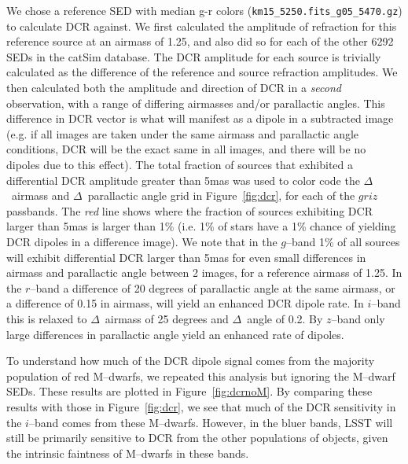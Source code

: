 \documentclass[DM,toc]{lsstdoc}
\begin{document}
We chose a reference SED with median g-r colors
(\texttt{km15\_5250.fits\_g05\_5470.gz}) to calculate DCR against.  We first
calculated the amplitude of refraction for this reference source at an
airmass of 1.25, and also did so for each of the other 6292 SEDs in
the catSim database.  The DCR amplitude for each source is trivially
calculated as the difference of the reference and source refraction
amplitudes.  We then calculated both the amplitude and direction of
DCR in a \emph{second} observation, with a range of differing airmasses
and/or parallactic angles.  This difference in DCR vector is what will
manifest as a dipole in a subtracted image (e.g. if all images are
taken under the same airmass and parallactic angle conditions, DCR
will be the exact same in all images, and there will be no dipoles due
to this effect).  The total fraction of sources that exhibited a
differential DCR amplitude greater than 5mas was used to color code
the $\Delta$~airmass and $\Delta$~parallactic angle grid in
Figure~\ref{fig:dcr}, for each of the $griz$ passbands.  The \emph{red}
line shows where the fraction of sources exhibiting DCR larger than
5mas is larger than 1\% (i.e. 1\% of stars have a 1\% chance of
yielding DCR dipoles in a difference image).  We note that in the
$g$--band 1\% of all sources will exhibit differential DCR larger than
5mas for even small differences in airmass and parallactic angle
between 2 images, for a reference airmass of 1.25.  In the $r$--band a
difference of 20 degrees of parallactic angle at the same airmass, or
a difference of 0.15 in airmass, will yield an enhanced DCR dipole
rate.  In $i$--band this is relaxed to $\Delta$~airmass of 25 degrees
and $\Delta$~angle of 0.2.  By $z$--band only large differences in
parallactic angle yield an enhanced rate of dipoles.

To understand how much of the DCR dipole signal comes from the
majority population of red M--dwarfs, we repeated this analysis but
ignoring the M--dwarf SEDs.  These results are plotted in
Figure~\ref{fig:dcrnoM}.  By comparing these results with those in
Figure~\ref{fig:dcr}, we see that much of the DCR sensitivity in the
$i$--band comes from these M--dwarfs.  However, in the bluer bands,
LSST will still be primarily sensitive to DCR from the other
populations of objects, given the intrinsic faintness of M--dwarfs in
these bands.
\end{document}
